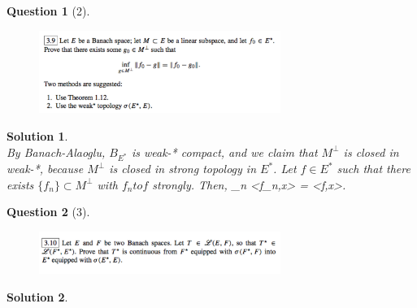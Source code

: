 \documentclass{article} %
\def\eQb#1\eQe{\begin{eqnarray*}#1\end{eqnarray*}}
\theoremstyle{quest}
\newtheorem*{question}{Question}
\newtheorem*{solution}{Solution}
\begin{document}
\begin{question}[2]
\hfill
\begin{figure}[h!]
  \centering
    \includegraphics[width=0.7\textwidth]{funcA-h-e3-p2.png}
\end{figure}
\end{question}
\begin{solution} \hfill \\
By Banach-Alaoglu, $B_{E^*}$ is weak-* compact, and we claim that $M^{\perp}$ is
closed in weak-*, because $M^{\perp}$ is closed in strong topology in $E^*$. 
Let $f \in E^*$ such that there exists $\{f_n\} \subset M^{\perp}$ with 
$f_n to f$ strongly. Then,
\eQb
\lim_{n \to \infty} <f_n,x> = <f,x>. 
\eQe 


\end{solution}

\newpage

\begin{question}[3]
\hfill
\begin{figure}[h!]
  \centering
    \includegraphics[width=0.7\textwidth]{funcA-h-e3-p3.png}
\end{figure}
\end{question}
\begin{solution} \hfill \\
\end{solution}

\newpage
\end{document}
